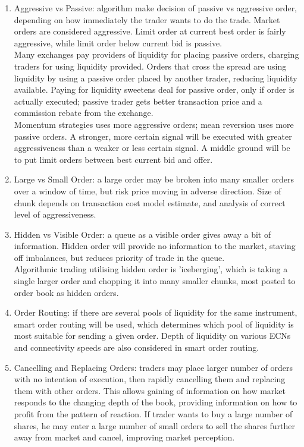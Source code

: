 \documentclass[a4paper,oneside,openany]{book}
\begin{document}
\begin{remark} 
\begin{enumerate}[label=\roman*.]
\setlength{\itemsep}{0pt}
\item Aggressive vs Passive: algorithm make decision of passive vs aggressive order, depending on how immediately the trader wants to do the trade. Market orders are considered aggressive. Limit order at current best order is fairly aggressive, while limit order below current bid is passive.\\
Many exchanges pay providers of liquidity for placing passive orders, charging traders for using liquidity provided. Orders that cross the spread are using liquidity by using a passive order placed by another trader, reducing liquidity available. Paying for liquidity sweetens deal for passive order, only if order is actually executed; passive trader gets better transaction price and a commission rebate from the exchange.\\
Momentum strategies uses more aggressive orders; mean reversion uses more passive orders. A stronger, more certain signal will be executed with greater aggressiveness than a weaker or less certain signal. A middle ground will be to put limit orders between best current bid and offer.
\item Large vs Small Order: a large order may be broken into many smaller orders over a window of time, but risk price moving in adverse direction. Size of chunk depends on transaction cost model estimate, and analysis of correct level of aggressiveness.
\item Hidden vs Visible Order: a queue as a visible order gives away a bit of information. Hidden order will provide no information to the market, staving off imbalances, but reduces priority of trade in the queue.\\
Algorithmic trading utilising hidden order is 'iceberging', which is taking a single larger order and chopping it into many smaller chunks, most posted to order book as hidden orders.
\item Order Routing: if there are several pools of liquidity for the same instrument, smart order routing will be used, which determines which pool of liquidity is most suitable for sending a given order. Depth of liquidity on various ECNs and connectivity speeds are also considered in smart order routing.
\item Cancelling and Replacing Orders: traders may place larger number of orders with no intention of execution, then rapidly cancelling them and replacing them with other orders. This allows gaining of information on how market responds to the changing depth of the book, providing information on how to profit from the pattern of reaction. If trader wants to buy a large number of shares, he may enter a large number of small orders to sell the shares further away from market and cancel, improving market perception.
\end{enumerate}
\end{remark}
\end{document}

